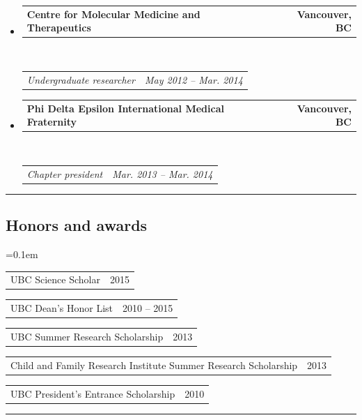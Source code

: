 \documentclass[10pt,letterpaper]{article}
\makeatletter
\newcommand{\headerrow}[2]
{\begin{tabular*}{\linewidth}{l@{\extracolsep{\fill}}r}
	#1 &
	#2 \\
\end{tabular*}}
\makeatother
\begin{document}
\begin{itemize}
	\parskip=0.1em

	\item 
	\headerrow
		{\textbf{Centre for Molecular Medicine and Therapeutics}}
		{\textbf{Vancouver, BC}}
	\\
	\headerrow
		{\emph{Undergraduate researcher}}
		{\emph{May 2012 -- Mar. 2014}}
	
	\item 
	\headerrow
		{\textbf{Phi Delta Epsilon International Medical Fraternity}}
		{\textbf{Vancouver, BC}}
	\\
	\headerrow
		{\emph{Chapter president}}
		{\emph{Mar. 2013 -- Mar. 2014}}
\end{itemize}


\hrule
\vspace{-0.4em}

\subsection*{Honors and awards}

\begin{itemize*}
	\parskip=0.1em
	\item 
	\headerrow
		{{UBC Science Scholar}}
		{{2015}}
	\item 
	\headerrow
		{{UBC Dean's Honor List}}
		{{2010 -- 2015}}
	\item 
	\headerrow
		{{UBC Summer Research Scholarship}}
		{{2013}}
	\item 
	\headerrow
		{{Child and Family Research Institute Summer Research Scholarship}}
		{{2013}}
	\item 
	\headerrow
		{{UBC President's Entrance Scholarship}}
		{{2010}}
\end{itemize*}


\hrule
\vspace{-0.4em}
\end{document}
